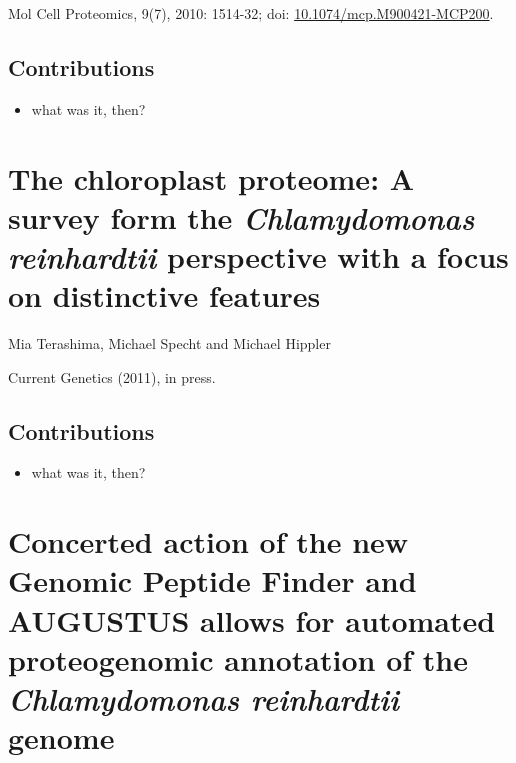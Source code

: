Mol Cell Proteomics, 9(7), 2010: 1514-32; doi: \href{http://dx.doi.org/10.1074/mcp.M900421-MCP200}{10.1074/mcp.M900421-MCP200}.

\subsection*{Contributions}

\begin{itemize}
\item what was it, then?
\end{itemize}


\cleardoublepage
\section{The chloroplast proteome: A survey form the {\em Chlamydomonas reinhardtii} perspective with a focus on distinctive features}

Mia Terashima, Michael Specht and Michael Hippler

Current Genetics (2011), in press.

\subsection*{Contributions}

\begin{itemize}
\item what was it, then?
\end{itemize}


\cleardoublepage
\section{Concerted action of the new Genomic Peptide Finder and AUGUSTUS allows for automated proteogenomic annotation of the {\em Chlamydomonas reinhardtii} genome}

